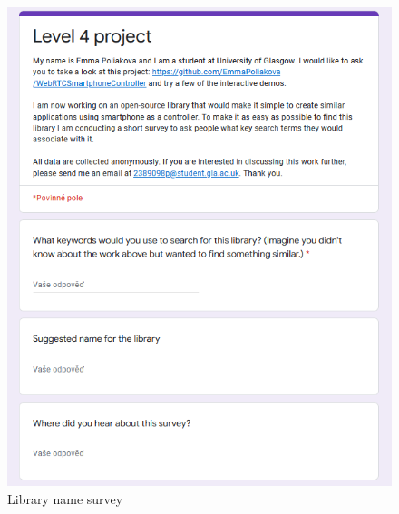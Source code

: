 \documentclass{l4proj}
\begin{document}
\begin{appendices}
\begin{figure}[h!]
    \centering
    \includegraphics[width=14cm]{./images/survey.png}
    \caption{Library name survey}
\end{figure}


\end{appendices}





\renewcommand{\thechapter}{0} 

\end{document}
